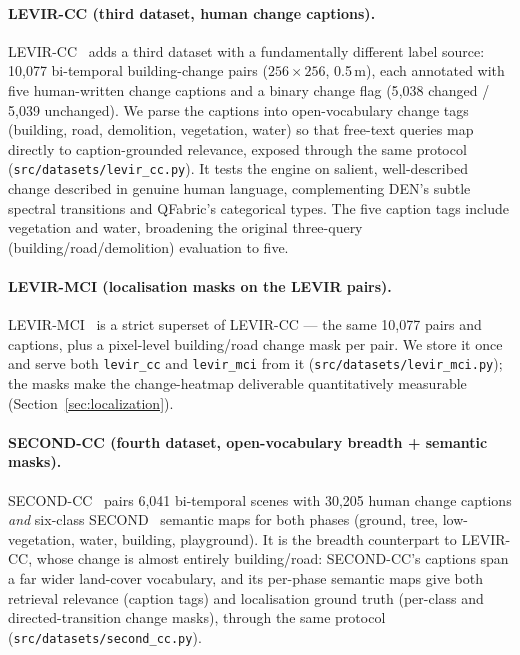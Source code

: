 \documentclass{article}
\begin{document}
\paragraph{LEVIR-CC (third dataset, human change captions).}
LEVIR-CC~\cite{levircc} adds a third dataset with a fundamentally different
label source: 10{,}077 bi-temporal building-change pairs ($256\times256$,
0.5\,m), each annotated with five human-written change captions and a binary
change flag (5{,}038 changed / 5{,}039 unchanged). We parse the captions into
open-vocabulary change tags (building, road, demolition, vegetation, water) so
that free-text queries map directly to caption-grounded relevance, exposed
through the same protocol (\texttt{src/datasets/levir\_cc.py}). It tests the
engine on salient, well-described change described in genuine human language,
complementing DEN's subtle spectral transitions and QFabric's categorical types.
The five caption tags include vegetation and water, broadening the original
three-query (building/road/demolition) evaluation to five.

\paragraph{LEVIR-MCI (localisation masks on the LEVIR pairs).}
LEVIR-MCI~\cite{levirmci} is a strict superset of LEVIR-CC --- the same
10{,}077 pairs and captions, plus a pixel-level building/road change mask per
pair. We store it once and serve both \texttt{levir\_cc} and \texttt{levir\_mci}
from it (\texttt{src/datasets/levir\_mci.py}); the masks make the change-heatmap
deliverable quantitatively measurable (Section~\ref{sec:localization}).

\paragraph{SECOND-CC (fourth dataset, open-vocabulary breadth + semantic masks).}
SECOND-CC~\cite{secondcc} pairs 6{,}041
bi-temporal scenes with 30{,}205 human change captions \emph{and} six-class
SECOND~\cite{second} semantic maps for both phases (ground, tree, low-vegetation, water,
building, playground). It is the breadth counterpart to LEVIR-CC, whose change is
almost entirely building/road: SECOND-CC's captions span a far wider land-cover
vocabulary, and its per-phase semantic maps give both retrieval relevance
(caption tags) and localisation ground truth (per-class and directed-transition
change masks), through the same protocol (\texttt{src/datasets/second\_cc.py}).
\end{document}
